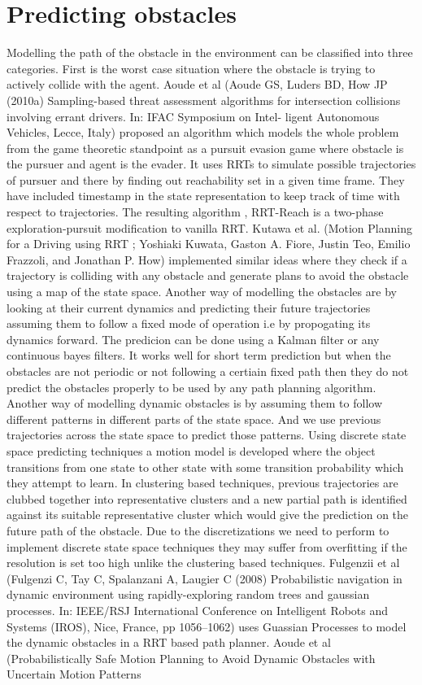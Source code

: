 \documentclass[MTech]{iitmdiss}
\begin{document}
\section{Predicting obstacles} 

Modelling the path of the obstacle in the environment can be classified into three categories. First is the worst case situation where the obstacle is trying to actively collide with the agent. Aoude et al (Aoude GS, Luders BD, How JP (2010a) Sampling-based threat assessment algorithms for intersection collisions involving errant drivers. In: IFAC Symposium on Intel- ligent Autonomous Vehicles, Lecce, Italy) proposed an algorithm which models the whole problem from the game theoretic standpoint as a pursuit evasion game where obstacle is the pursuer and agent is the evader. It uses RRTs to simulate possible trajectories of pursuer and there by finding out reachability set in a given time frame. They have included timestamp in the state representation to keep track of time with respect to trajectories. The resulting algorithm , RRT-Reach is a two-phase exploration-pursuit modification to vanilla RRT. Kutawa et al. (Motion Planning for a Driving using RRT ; Yoshiaki Kuwata, Gaston A. Fiore, Justin Teo, Emilio Frazzoli, and Jonathan P. How) implemented similar ideas where they check if a trajectory is colliding with any obstacle and generate plans to avoid the obstacle using a map of the state space. Another way of modelling the obstacles are by looking at their current dynamics and predicting their future trajectories assuming them to follow a fixed mode of operation i.e by propogating its dynamics forward. The predicion can be done using a Kalman filter or any continuous bayes filters. It works well for short term prediction but when the obstacles are not periodic or not following a certiain fixed path then they do not predict the obstacles properly to be used by any path planning algorithm. Another way of modelling dynamic obstacles is by assuming them to follow different patterns in different parts of the state space. And we use previous trajectories across the state space to predict those patterns. Using discrete state space predicting techniques a motion model is developed where the object transitions from one state to other state with some transition probability which they attempt to learn. In clustering based techniques, previous trajectories are clubbed together into representative clusters and a new partial path is identified against its suitable representative cluster which would give the prediction on the future path of the obstacle. Due to the discretizations we need to perform to implement discrete state space techniques they may suffer from overfitting if the resolution is set too high unlike the clustering based techniques. Fulgenzii et al (Fulgenzi C, Tay C, Spalanzani A, Laugier C (2008) Probabilistic navigation in dynamic environment using rapidly-exploring random trees and gaussian processes. In: IEEE/RSJ International Conference on Intelligent Robots and Systems (IROS), Nice, France, pp 1056–1062) uses Guassian Processes to model the dynamic obstacles in a RRT based path planner. Aoude et al (Probabilistically Safe Motion Planning to Avoid Dynamic Obstacles with Uncertain Motion Patterns
\end{document}

